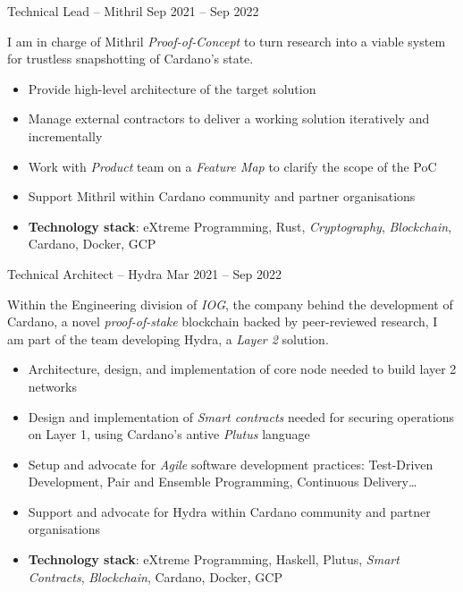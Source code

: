 \documentclass[12pt,a4paper]{article}
\begin{document}
{  \headedsubsection
      {Technical Lead -- Mithril}
      {Sep 2021 -- Sep 2022}\\
      {I am in charge of Mithril \emph{Proof-of-Concept} to turn research into a viable system for trustless snapshotting of Cardano's state.
        \begin{itemize}
        \item Provide high-level architecture of the target solution
        \item Manage external contractors to deliver a working solution iteratively and incrementally
        \item Work with \emph{Product} team on a \emph{Feature Map} to clarify the scope of the PoC
        \item Support Mithril within Cardano community and partner organisations
        \item \textbf{Technology stack}: eXtreme Programming, Rust, \emph{Cryptography}, \emph{Blockchain}, Cardano, Docker, GCP
        \end{itemize}
      }

  \headedsubsection
      {Technical Architect -- Hydra}
      {Mar 2021 -- Sep 2022}\\
      {Within the Engineering division of \emph{IOG}, the company behind the development of Cardano, a novel \emph{proof-of-stake} blockchain backed by peer-reviewed research, I am part of the team developing Hydra, a \emph{Layer 2} solution.
        \begin{itemize}
        \item Architecture, design, and implementation of core node needed to build layer 2 networks
        \item Design and implementation of \emph{Smart contracts} needed for securing operations on Layer 1, using Cardano's antive \emph{Plutus} language
        \item Setup and advocate for \emph{Agile} software development practices: Test-Driven Development, Pair and Ensemble Programming, Continuous Delivery\dots
        \item Support and advocate for Hydra within Cardano community and partner organisations
        \item \textbf{Technology stack}: eXtreme Programming, Haskell, Plutus, \emph{Smart Contracts}, \emph{Blockchain}, Cardano, Docker, GCP
        \end{itemize}
      }
}
\end{document}

